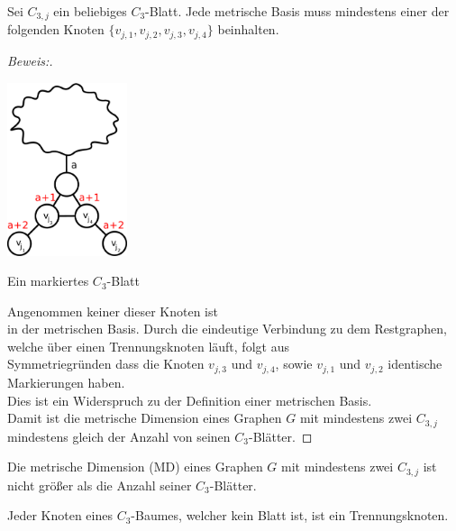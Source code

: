 \begin{lem}
Sei $C_{3,j}$ ein beliebiges $C_{3}$-Blatt. Jede metrische Basis muss mindestens einer der folgenden Knoten $\{v_{j,1},v_{j,2},v_{j,3},v_{j,4}\}$ beinhalten.
\end{lem}
\begin{proof}[Beweis:]~
\par
\vspace{-2mm}
\begin{floatingfigure}[l]{200pt}
{\flushleft
\hspace*{1.7cm}
\includegraphics[width=100pt]{bilder/beweis.pdf}}
\caption{Ein markiertes $C_{3}$-Blatt}
\end{floatingfigure}
Angenommen keiner dieser Knoten ist\\in der metrischen Basis. Durch die eindeutige Verbindung zu dem Restgraphen, welche über einen Trennungsknoten läuft, folgt aus\\Symmetriegründen dass die Knoten $v_{j,3}$ und $v_{j,4}$, sowie $v_{j,1}$ und $v_{j,2}$ identische Markierungen haben.\\Dies ist ein Widerspruch zu der Definition einer metrischen Basis.\\
Damit ist die metrische Dimension eines Graphen $G$ mit mindestens zwei $C_{3,j}$\\mindestens gleich der Anzahl von seinen $C_{3}$-Blätter.
\end{proof}
\par
\vspace{+3mm}
\begin{lem}
Die metrische Dimension (MD) eines Graphen $G$ mit mindestens zwei $C_{3,j}$ ist nicht größer als die Anzahl seiner $C_{3}$-Blätter. 
\end{lem}
\begin{lem}
\label{bkb}
Jeder Knoten eines $C_{3}$-Baumes, welcher kein Blatt ist, ist ein Trennungsknoten.
\end{lem}


